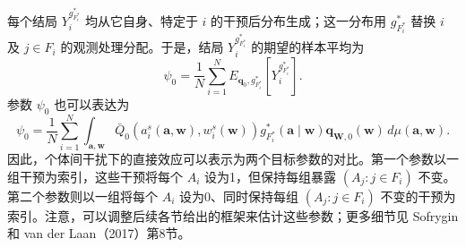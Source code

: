 每个结局 $Y_i^{g_{F_i^*}^*}$ 均从它自身、特定于 $i$ 的干预后分布生成；这一分布用 $g_{F_i^*}^*$ 替换 $i$ 及 $j\in F_i$ 的观测处理分配。于是，结局 $Y_i^{g_{F_i^*}^*}$ 的期望的样本平均为
\begin{equation}
 \psi_0=\frac{1}{N}\sum_{i=1}^N
 E_{\bm q_0,g_{F_i^*}^*}\left[Y_i^{g_{F_i^*}^*}\right].
 \tag{21.7}
\end{equation}
参数 $\psi_0$ 也可以表达为
\begin{equation}
 \psi_0=\frac{1}{N}\sum_{i=1}^N\int_{\bm a,\bm w}
 \bar Q_0(a_i^s(\bm a,\bm w),w_i^s(\bm w))
 g_{F_i^*}^*(\bm a\mid\bm w)\bm q_{\bm W,0}(\bm w)\,d\mu(\bm a,\bm w).
 \tag{21.8}
\end{equation}
因此，个体间干扰下的直接效应可以表示为两个目标参数的对比。第一个参数以一组干预为索引，这些干预将每个 $A_i$ 设为1，但保持每组暴露 $(A_j:j\in F_i)$ 不变。第二个参数则以一组将每个 $A_i$ 设为0、同时保持每组 $(A_j:j\in F_i)$ 不变的干预为索引。注意，可以调整后续各节给出的框架来估计这些参数；更多细节见 Sofrygin 和 van der Laan（2017）第8节。
